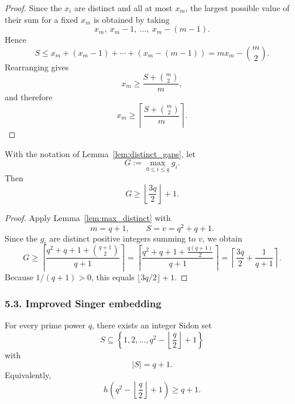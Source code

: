 \begin{proof}
Since the $x_i$ are distinct and all at most $x_m$, the largest possible value of their sum for a fixed $x_m$ is obtained by taking
\[
x_m,\ x_m-1,\ \dots,\ x_m-(m-1).
\]
Hence
\[
S\le x_m+(x_m-1)+\cdots+(x_m-(m-1))
   =m x_m-\binom{m}{2}.
\]
Rearranging gives
\[
x_m\ge \frac{S+\binom{m}{2}}{m},
\]
and therefore
\[
x_m\ge \left\lceil \frac{S+\binom{m}{2}}{m}\right\rceil.
\]
\end{proof}

\begin{corollary}\label{cor:gap_lb}
With the notation of Lemma~\ref{lem:distinct_gaps}, let
\[
G:=\max_{0\le i\le q} g_i.
\]
Then
\[
G\ge \left\lfloor \frac{3q}{2}\right\rfloor+1.
\]
\end{corollary}

\begin{proof}
Apply Lemma~\ref{lem:max_distinct} with
\[
m=q+1,\qquad S=v=q^2+q+1.
\]
Since the $g_i$ are distinct positive integers summing to $v$, we obtain
\[
G\ge \left\lceil \frac{q^2+q+1+\binom{q+1}{2}}{q+1}\right\rceil
 = \left\lceil \frac{q^2+q+1+\frac{q(q+1)}2}{q+1}\right\rceil
 = \left\lceil \frac{3q}{2}+\frac{1}{q+1}\right\rceil.
\]
Because $1/(q+1)>0$, this equals $\lfloor 3q/2\rfloor+1$.
\end{proof}

\subsubsection{5.3. Improved Singer embedding}
\begin{theorem}\label{thm:improved_singer}
For every prime power $q$, there exists an integer Sidon set
\[
S\subseteq \left\{1,2,\dots, q^2-\left\lfloor \frac q2\right\rfloor+1\right\}
\]
with
\[
|S|=q+1.
\]
Equivalently,
\[
h\!\left(q^2-\left\lfloor \frac q2\right\rfloor+1\right)\ge q+1.
\]
\end{theorem}

